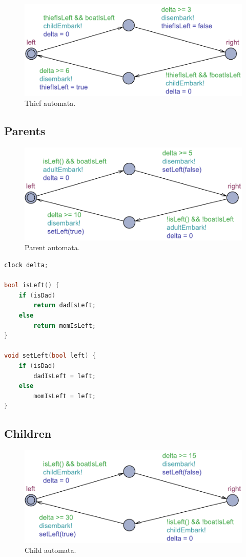 \documentclass[a4paper,12pt]{scrartcl}
\begin{document}
\begin{figure}[h!]
\centering
\includegraphics[width=0.7\linewidth]{Thief.pdf}
\caption{Thief automata.}
\label{fig:thief}
\end{figure}

\subsection*{Parents}

\begin{figure}[h!]
\centering
\includegraphics[width=0.7\linewidth]{Parent.pdf}
\caption{Parent automata.}
\label{fig:parent}
\end{figure}

\begin{lstlisting}[language=CPP, label = lst:plugin_example, caption = Parent declaration.]
clock delta;

bool isLeft() {
    if (isDad)
        return dadIsLeft;
    else
        return momIsLeft;
}

void setLeft(bool left) {
    if (isDad)
        dadIsLeft = left;
    else
        momIsLeft = left;
}
\end{lstlisting}



\subsection*{Children}

\begin{figure}[h!]
\centering
\includegraphics[width=0.7\linewidth]{Child.pdf}
\caption{Child automata.}
\label{fig:child}
\end{figure}
\end{document}
